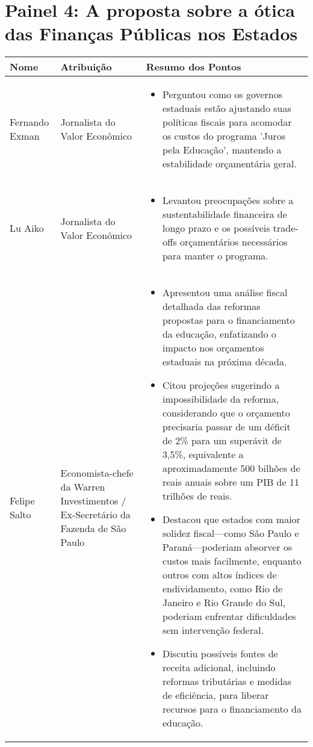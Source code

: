 \documentclass[a4paper,10pt]{article}
\begin{document}
\newpage

\section*{Painel 4: A proposta sobre a ótica das Finanças Públicas nos Estados}

\begin{table}[htbp!]
	\centering
	\renewcommand{\arraystretch}{1.2}
	\begin{tabular}{|p{1.2in}|p{1.6in}|p{4.2in}|}
		\hline
		Nome & Atribuição & Resumo dos Pontos \\
		\hline
		Fernando Exman & Jornalista do Valor Econômico & 
		\begin{itemize}
			\item Perguntou como os governos estaduais estão ajustando suas políticas fiscais para acomodar os custos do programa 'Juros pela Educação', mantendo a estabilidade orçamentária geral.
		\end{itemize}\\
		\hline
		Lu Aiko & Jornalista do Valor Econômico & \begin{itemize}
			\item Levantou preocupações sobre a sustentabilidade financeira de longo prazo e os possíveis trade-offs orçamentários necessários para manter o programa.
		\end{itemize}\\
		\hline
		Felipe Salto & Economista-chefe da Warren Investimentos / Ex-Secretário da Fazenda de São Paulo & \begin{itemize}
			\item Apresentou uma análise fiscal detalhada das reformas propostas para o financiamento da educação, enfatizando o impacto nos orçamentos estaduais na próxima década.
			\item Citou projeções sugerindo a impossibilidade da reforma, considerando que o orçamento precisaria passar de um déficit de 2\% para um superávit de 3,5\%, equivalente a aproximadamente 500 bilhões de reais anuais sobre um PIB de 11 trilhões de reais.
			\item Destacou que estados com maior solidez fiscal—como São Paulo e Paraná—poderiam absorver os custos mais facilmente, enquanto outros com altos índices de endividamento, como Rio de Janeiro e Rio Grande do Sul, poderiam enfrentar dificuldades sem intervenção federal.
			\item Discutiu possíveis fontes de receita adicional, incluindo reformas tributárias e medidas de eficiência, para liberar recursos para o financiamento da educação.

\end{itemize}
\end{tabular}
\end{table}
\end{document}
